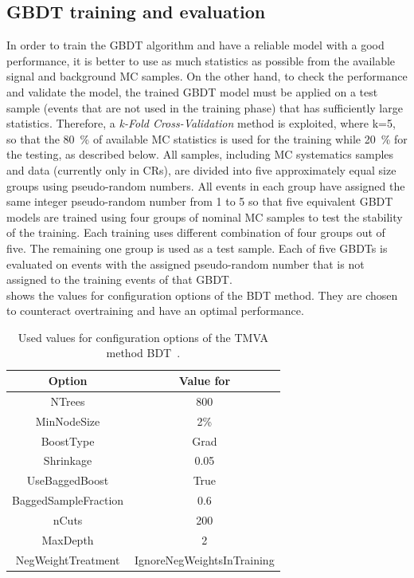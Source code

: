 \subsection {GBDT training and evaluation}
In order to train the GBDT algorithm and have a reliable model with a good performance, it is better to use as much statistics as possible from the available signal and background MC samples.
On the other hand, to check the performance and validate the model, 
the trained GBDT model must be applied on a test sample (events that are not used in the training phase) that has sufficiently large statistics. 
Therefore, a \textit{k-Fold Cross-Validation} method is exploited, where k=5, so that the \SI{80}{\%} of available MC statistics is used for the training while 
\SI{20}{\%} for the testing, as described below.
All samples, including MC systematics samples and data (currently only in CRs), are divided into five approximately equal size groups using pseudo-random numbers. %
All events in each group have assigned the same integer pseudo-random number from 1 to 5 so that
five equivalent GBDT models are trained using four groups of nominal MC samples to test the stability of the training. 
Each training uses different combination of four groups out of five. 
The remaining one group is used as a test sample.
Each of five GBDTs is evaluated on events with the assigned pseudo-random number
that is not assigned to the training events of that GBDT. \\
 shows the values for configuration options of the BDT method.
They are chosen to counteract overtraining and have an optimal performance.
\begin{table}[!htbp]
	\small
	\centering 
	\begin{tabular}{cc}
		\toprule
		Option & Value for \Dthree \\
		\hline
		NTrees & 800 \\ 
		MinNodeSize & 2\% \\
		BoostType & Grad \\
		Shrinkage & 0.05 \\
		UseBaggedBoost  & True \\
		BaggedSampleFraction & 0.6\\
		nCuts  & 200 \\
		MaxDepth &  2\\
		NegWeightTreatment & IgnoreNegWeightsInTraining\\
		\bottomrule
	\end{tabular}
	\caption{
	Used values for configuration options of the TMVA method BDT~\cite{TMVA}. 
}%
\label{tab:BDTparam}
\end{table}

